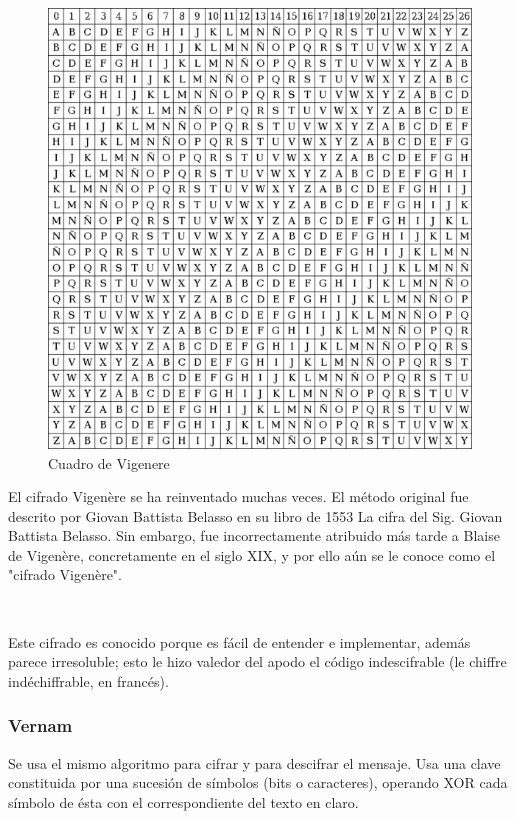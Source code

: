 \documentclass[11pt, conference]{IEEEtran}
\begin{document}
\begin{figure}[h]
	\begin{center}
		\includegraphics[scale=0.5]{Cuadro_Vigenere.PNG}
		\caption{Cuadro de Vigenere} 
	\end{center}
\end{figure}

El cifrado Vigenère se ha reinventado muchas veces. El método original fue descrito por Giovan Battista Belasso en su libro de 1553 La cifra del Sig. Giovan Battista Belasso. Sin embargo, fue incorrectamente atribuido más tarde a Blaise de Vigenère, concretamente en el siglo XIX, y por ello aún se le conoce como el "cifrado Vigenère".

\

Este cifrado es conocido porque es fácil de entender e implementar, además parece irresoluble; esto le hizo valedor del apodo el código indescifrable (le chiffre indéchiffrable, en francés).

\subsubsection{Vernam}
Se usa el mismo algoritmo para cifrar y para descifrar el mensaje. Usa una clave constituida por una sucesión de símbolos (bits o caracteres), operando XOR cada símbolo de ésta con el correspondiente del texto en claro.
\end{document}
